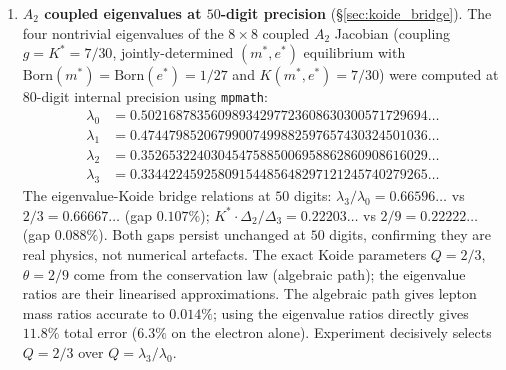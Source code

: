 \documentclass[11pt,a4paper]{article}
\theoremstyle{definition}
\theoremstyle{remark}
\begin{document}
\begin{enumerate}[nosep]
\item \textbf{$A_2$ coupled eigenvalues at $50$-digit precision} (\S\ref{sec:koide_bridge}). The four nontrivial eigenvalues of the $8\times 8$ coupled $A_2$ Jacobian (coupling $g=K^*=7/30$, jointly-determined $(m^*,e^*)$ equilibrium with $\mathrm{Born}(m^*)=\mathrm{Born}(e^*)=1/27$ and $K(m^*,e^*)=7/30$) were computed at $80$-digit internal precision using \texttt{mpmath}:
\begin{align*}
\lambda_0 &= 0.50216878356098934297723608630300571729694\ldots\\
\lambda_1 &= 0.47447985206799007499882597657430324501036\ldots\\
\lambda_2 &= 0.35265322403045475885006958862860908616029\ldots\\
\lambda_3 &= 0.33442245925809154485648297121245740279265\ldots
\end{align*}
The eigenvalue-Koide bridge relations at $50$ digits: $\lambda_3/\lambda_0=0.66596\ldots$ vs $2/3=0.66667\ldots$ (gap $0.107\%$); $K^*\cdot\Delta_2/\Delta_3=0.22203\ldots$ vs $2/9=0.22222\ldots$ (gap $0.088\%$). Both gaps persist unchanged at $50$ digits, confirming they are real physics, not numerical artefacts. The exact Koide parameters $Q=2/3$, $\theta=2/9$ come from the conservation law (algebraic path); the eigenvalue ratios are their linearised approximations. The algebraic path gives lepton mass ratios accurate to $0.014\%$; using the eigenvalue ratios directly gives $11.8\%$ total error ($6.3\%$ on the electron alone). Experiment decisively selects $Q=2/3$ over $Q=\lambda_3/\lambda_0$.


\end{enumerate}
\end{document}
